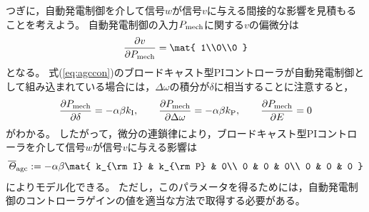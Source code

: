 \documentclass[tombow,dvipdfmx]{corona-a5-1.1}
\begin{document}
つぎに，自動発電制御を介して信号$w$が信号$v$に与える間接的な影響を見積もることを考えよう。
自動発電制御の入力$P_{\rm mech}$に関する$v$の偏微分は
\[
\frac{\partial v}{\partial P_{\rm mech}}
=
\mat{
1\\0\\0
}
\]
となる。
式(\ref{eq:agccon})のブロードキャスト型PIコントローラが自動発電制御として組み込まれている場合には，$\Delta \omega$の積分が$\delta$に相当することに注意すると，
\[
\frac{\partial P_{\rm mech}}{\partial \delta} = -  \alpha \beta k_{\rm I}
,\qquad
\frac{\partial P_{\rm mech}}{\partial \Delta \omega}= - \alpha \beta k_{\rm P}
,\qquad
\frac{\partial P_{\rm mech}}{\partial E}= 0
\]
がわかる。
したがって，微分の連鎖律により，ブロードキャスト型PIコントローラを介して信号$w$が信号$v$に与える影響は
\begin{align}
\overline{\mathit{\Theta}}_{\rm agc}:=
-  \alpha \beta \mat{
 k_{\rm I} &  k_{\rm P} & 0\\
0 & 0 & 0\\
0 & 0 & 0
}
\end{align}
によりモデル化できる。
ただし，このパラメータを得るためには，自動発電制御のコントローラゲインの値を適当な方法で取得する必要がある。
\end{document}

